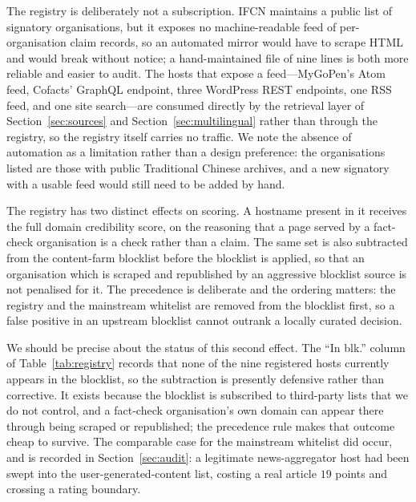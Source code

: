 \documentclass[twoside]{llncs}
\begin{document}
The registry is deliberately not a subscription. IFCN maintains a public list of signatory organisations, but it exposes no machine-readable feed of per-organisation claim records, so an automated mirror would have to scrape HTML and would break without notice; a hand-maintained file of nine lines is both more reliable and easier to audit. The hosts that expose a feed---MyGoPen's Atom feed, Cofacts' GraphQL endpoint, three WordPress REST endpoints, one RSS feed, and one site search---are consumed directly by the retrieval layer of Section~\ref{sec:sources} and Section~\ref{sec:multilingual} rather than through the registry, so the registry itself carries no traffic. We note the absence of automation as a limitation rather than a design preference: the organisations listed are those with public Traditional Chinese archives, and a new signatory with a usable feed would still need to be added by hand.

The registry has two distinct effects on scoring. A hostname present in it receives the full domain credibility score, on the reasoning that a page served by a fact-check organisation is a check rather than a claim. The same set is also subtracted from the content-farm blocklist before the blocklist is applied, so that an organisation which is scraped and republished by an aggressive blocklist source is not penalised for it. The precedence is deliberate and the ordering matters: the registry and the mainstream whitelist are removed from the blocklist first, so a false positive in an upstream blocklist cannot outrank a locally curated decision.

We should be precise about the status of this second effect. The ``In blk.'' column of Table~\ref{tab:registry} records that none of the nine registered hosts currently appears in the blocklist, so the subtraction is presently defensive rather than corrective. It exists because the blocklist is subscribed to third-party lists that we do not control, and a fact-check organisation's own domain can appear there through being scraped or republished; the precedence rule makes that outcome cheap to survive. The comparable case for the mainstream whitelist did occur, and is recorded in Section~\ref{sec:audit}: a legitimate news-aggregator host had been swept into the user-generated-content list, costing a real article $19$ points and crossing a rating boundary.

\end{document}
